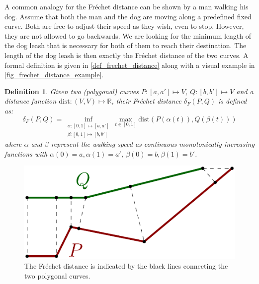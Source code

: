 \documentclass[
oneside,
fontsize=11pt
]{scrartcl}
\newtheorem{mydef}{Definition}
\begin{document}
A common analogy for the Fréchet distance can be shown by a man walking his dog. 
Assume that both the man and the dog are moving along a predefined fixed curve. 
Both are free to adjust their speed as they wish, even to stop. 
However, they are not allowed to go backwards. 
We are looking for the minimum length of the dog leash 
that is necessary for both of them to reach their destination. 
The length of the dog leash is then exactly the Fréchet distance of the two curves.
A formal definition is given in \autoref{def_frechet_distance} 
along with a visual example in \autoref{fig_frechet_distance_example}.

\begin{mydef}
  \label{def_frechet_distance}
  Given two (polygonal) curves $P: [a,a'] \mapsto V$, $Q: [b,b'] \mapsto V$ and a distance function $\text{dist}: (V,V) \mapsto \mathbb{R}$, 
  their Fréchet distance $\delta_{F}(P,Q)$ is defined as: 
  $$\delta_{F}(P,Q) = \inf_{\substack{\alpha: [0,1] \mapsto [a, a'] \\ \beta: [0,1] \mapsto [b, b']}} \max_{t \in [0,1]} \text{dist}(P(\alpha(t)), Q(\beta(t)))$$
  where $\alpha$ and $\beta$ represent the walking speed as 
  continuous monotonically increasing functions with
  $\alpha(0) = a, \alpha(1) = a'$, 
  $\beta(0) =b, \beta(1) =b'$.
\end{mydef}

\begin{figure}[ht]
  \centering
  \includegraphics{images/frechet_distance/frechet-distance-example.pdf}
  \caption{The Fréchet distance is indicated by the black lines connecting the two polygonal curves.}
  \label{fig_frechet_distance_example}
\end{figure}



\end{document}
